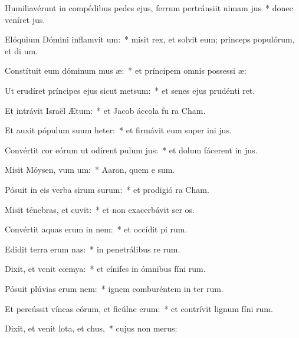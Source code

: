 \item Humiliavérunt in compédibus pedes ejus, ferrum pertránsiit nimam jus~* donec veníret  jus.
\item Elóquium Dómini inflamvit um:~* misit rex, et solvit eum; princeps populórum, et di um.
\item Constítuit eum dóminum mus æ:~* et príncipem omnis possessi æ:
\item Ut erudíret príncipes ejus sicut metsum:~* et senes ejus prudénti ret.
\item Et intrávit Israël  Ætum:~* et Jacob áccola fu  ra Cham.
\item Et auxit pópulum suum heter:~* et firmávit eum super ini jus.
\item Convértit cor eórum ut odírent pulum jus:~* et dolum fácerent in  jus.
\item Misit Móysen, vum um:~* Aaron, quem e sum.
\item Pósuit in eis verba sirum surum:~* et prodigió  ra Cham.
\item Misit ténebras, et cuvit:~* et non exacerbávit ser os.
\item Convértit aquas erum in nem:~* et occídit pi rum.
\item Edidit terra erum nas:~* in penetrálibus re rum.
\item Dixit, et venit cœmya:~* et cínifes in ómnibus fíni rum.
\item Pósuit plúvias erum nem:~* ignem comburéntem in ter rum.
\item Et percússit víneas eórum, et ficúlne erum:~* et contrívit lignum fíni rum.
\item Dixit, et venit lota, et chus,~* cujus non  merus:
